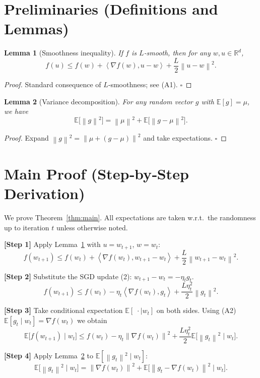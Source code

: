 \documentclass{article}
\newtheorem{lemma}{Lemma}
\newcommand{\EE}{\mathbb{E}}
\newcommand{\RR}{\mathbb{R}}
\newcommand{\norm}[1]{\left\lVert #1 \right\rVert}
\newcommand{\inner}[2]{\left\langle #1,#2 \right\rangle}
\begin{document}
\newpage
\section*{Preliminaries (Definitions and Lemmas)}
\begin{lemma}[Smoothness inequality]\label{lem:smooth}
If $f$ is $L$‑smooth, then for any $w,u\in\RR^{d}$,
\[
f(u)\le f(w)+\inner{\nabla f(w)}{u-w}+\frac{L}{2}\norm{u-w}^{2}.
\tag{4}
\]
\end{lemma}
\begin{proof}
Standard consequence of $L$‑smoothness; see (A1). \hfill $\square$
\end{proof}

\begin{lemma}[Variance decomposition]\label{lem:var}
For any random vector $g$ with $\EE[g]=\mu$, we have
\[
\EE\bigl[\norm{g}^{2}\bigr]=\norm{\mu}^{2}+\EE\bigl[\norm{g-\mu}^{2}\bigr].
\tag{5}
\]
\end{lemma}
\begin{proof}
Expand $\norm{g}^{2}= \norm{\mu+(g-\mu)}^{2}$ and take expectations. \hfill $\square$
\end{proof}

\section*{Main Proof (Step‑by‑Step Derivation)}
We prove Theorem~\ref{thm:main}. All expectations are taken w.r.t.\ the randomness up to iteration $t$ unless otherwise noted.

\noindent\textbf{[Step 1]} Apply Lemma~\ref{lem:smooth} with $u=w_{t+1}$, $w=w_t$:
\[
f(w_{t+1})\le f(w_t)+\inner{\nabla f(w_t)}{w_{t+1}-w_t}
+\frac{L}{2}\norm{w_{t+1}-w_t}^{2}.
\tag{6}
\]

\noindent\textbf{[Step 2]} Substitute the SGD update (2): $w_{t+1}-w_t=-\eta_t g_t$.
\[
f(w_{t+1})\le f(w_t)-\eta_t\inner{\nabla f(w_t)}{g_t}
+\frac{L\eta_t^{2}}{2}\norm{g_t}^{2}.
\tag{7}
\]

\noindent\textbf{[Step 3]} Take conditional expectation $\EE[\;\cdot\mid w_t]$ on both sides.
Using (A2) $\EE[g_t\mid w_t]=\nabla f(w_t)$ we obtain
\[
\EE\!\bigl[f(w_{t+1})\mid w_t\bigr]\le
f(w_t)-\eta_t\norm{\nabla f(w_t)}^{2}
+\frac{L\eta_t^{2}}{2}\EE\!\bigl[\norm{g_t}^{2}\mid w_t\bigr].
\tag{8}
\]

\noindent\textbf{[Step 4]} Apply Lemma~\ref{lem:var} to $\EE[\norm{g_t}^{2}\mid w_t]$:
\[
\EE\!\bigl[\norm{g_t}^{2}\mid w_t\bigr]
=\norm{\nabla f(w_t)}^{2}+\EE\!\bigl[\norm{g_t-\nabla f(w_t)}^{2}\mid w_t\bigr].
\tag{9}
\]
\end{document}
